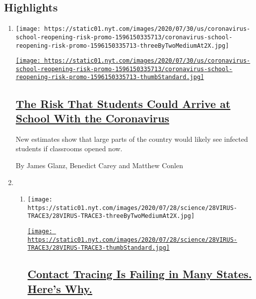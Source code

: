\hypertarget{highlights}{%
\subsection{Highlights}\label{highlights}}

\begin{enumerate}
\def\labelenumi{\arabic{enumi}.}
\item
  \texttt{[image: https://static01.nyt.com/images/2020/07/30/us/coronavirus-school-reopening-risk-promo-1596150335713/coronavirus-school-reopening-risk-promo-1596150335713-threeByTwoMediumAt2X.jpg]}

  \href{/interactive/2020/07/31/us/coronavirus-school-reopening-risk.html}{\texttt{[image: https://static01.nyt.com/images/2020/07/30/us/coronavirus-school-reopening-risk-promo-1596150335713/coronavirus-school-reopening-risk-promo-1596150335713-thumbStandard.jpg]}}

  \hypertarget{the-risk-that-students-could-arrive-at-school-with-the-coronavirus}{%
  \subsection{\texorpdfstring{\href{/interactive/2020/07/31/us/coronavirus-school-reopening-risk.html}{The
  Risk That Students Could Arrive at School With the
  Coronavirus}}{The Risk That Students Could Arrive at School With the Coronavirus}}\label{the-risk-that-students-could-arrive-at-school-with-the-coronavirus}}

  New estimates show that large parts of the country would likely see
  infected students if classrooms opened now.

  By James Glanz, Benedict Carey and Matthew Conlen
\item
  \begin{enumerate}
  \def\labelenumii{\arabic{enumii}.}
  \item
    \texttt{[image: https://static01.nyt.com/images/2020/07/28/science/28VIRUS-TRACE3/28VIRUS-TRACE3-threeByTwoMediumAt2X.jpg]}

    \href{/2020/07/31/health/covid-contact-tracing-tests.html}{\texttt{[image: https://static01.nyt.com/images/2020/07/28/science/28VIRUS-TRACE3/28VIRUS-TRACE3-thumbStandard.jpg]}}

    \hypertarget{contact-tracing-is-failing-in-many-states-heres-why}{%
    \subsection{\texorpdfstring{\href{/2020/07/31/health/covid-contact-tracing-tests.html}{Contact
    Tracing Is Failing in Many States. Here's
    Why.}}{Contact Tracing Is Failing in Many States. Here's Why.}}\label{contact-tracing-is-failing-in-many-states-heres-why}}


\end{enumerate}
\end{enumerate}
